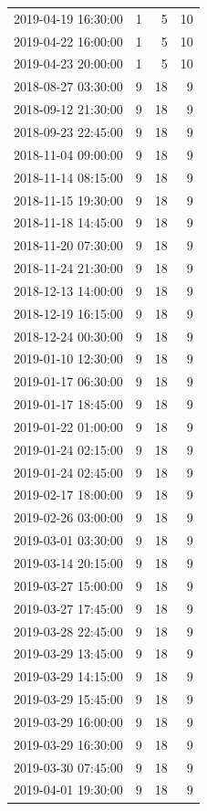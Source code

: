 \begin{tabular}{lrrr}
2019-04-19 16:30:00 & 1 & 5 & 10 \\
2019-04-22 16:00:00 & 1 & 5 & 10 \\
2019-04-23 20:00:00 & 1 & 5 & 10 \\
2018-08-27 03:30:00 & 9 & 18 & 9 \\
2018-09-12 21:30:00 & 9 & 18 & 9 \\
2018-09-23 22:45:00 & 9 & 18 & 9 \\
2018-11-04 09:00:00 & 9 & 18 & 9 \\
2018-11-14 08:15:00 & 9 & 18 & 9 \\
2018-11-15 19:30:00 & 9 & 18 & 9 \\
2018-11-18 14:45:00 & 9 & 18 & 9 \\
2018-11-20 07:30:00 & 9 & 18 & 9 \\
2018-11-24 21:30:00 & 9 & 18 & 9 \\
2018-12-13 14:00:00 & 9 & 18 & 9 \\
2018-12-19 16:15:00 & 9 & 18 & 9 \\
2018-12-24 00:30:00 & 9 & 18 & 9 \\
2019-01-10 12:30:00 & 9 & 18 & 9 \\
2019-01-17 06:30:00 & 9 & 18 & 9 \\
2019-01-17 18:45:00 & 9 & 18 & 9 \\
2019-01-22 01:00:00 & 9 & 18 & 9 \\
2019-01-24 02:15:00 & 9 & 18 & 9 \\
2019-01-24 02:45:00 & 9 & 18 & 9 \\
2019-02-17 18:00:00 & 9 & 18 & 9 \\
2019-02-26 03:00:00 & 9 & 18 & 9 \\
2019-03-01 03:30:00 & 9 & 18 & 9 \\
2019-03-14 20:15:00 & 9 & 18 & 9 \\
2019-03-27 15:00:00 & 9 & 18 & 9 \\
2019-03-27 17:45:00 & 9 & 18 & 9 \\
2019-03-28 22:45:00 & 9 & 18 & 9 \\
2019-03-29 13:45:00 & 9 & 18 & 9 \\
2019-03-29 14:15:00 & 9 & 18 & 9 \\
2019-03-29 15:45:00 & 9 & 18 & 9 \\
2019-03-29 16:00:00 & 9 & 18 & 9 \\
2019-03-29 16:30:00 & 9 & 18 & 9 \\
2019-03-30 07:45:00 & 9 & 18 & 9 \\
2019-04-01 19:30:00 & 9 & 18 & 9 \\

\end{tabular}
